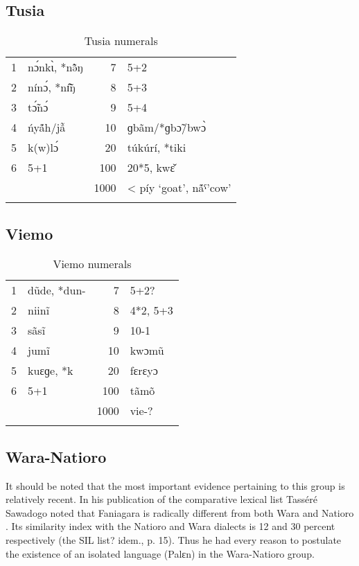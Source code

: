 \subsection{Tusia}%
\begin{table}
\caption{\label{tab:3:185}Tusia numerals}


\begin{tabularx}{\textwidth}{lQrQ}
\lsptoprule

1 & n{\'{ɔ}}nk{\`{ɩ}}, *n{\~{\^ə}}ŋ & 7 & 5+2\\
2 & nín{\'{ɔ}}, *n{\~{\^ɪ}}ŋ & 8 & 5+3\\
3 & t{\'{\~ɔ}}n{\'{ɔ}} & 9 & 5+4\\
4 & {\'{n}}y{\'{\~a}}h/j{\~{\^a}} & 10 & ɡb{\~{a}}m/*ɡb{\~{ɔ}}/bw{\`{ɔ}}\\
5 & k(w)l{\'{ɔ}} & 20 & t{\'{u}}k{\'{u}}rí, *tiki\\
6 & 5+1 & 100 & 20*5, kw{\v{ɛ}}\\
&  & 1000 & < píy `goat’, n{\'{\~a}}ˤ'cow'\\
\lspbottomrule
\end{tabularx}
\end{table}

 
\subsection{Viemo}%
\begin{table}
\caption{\label{tab:3:186}Viemo numerals}


\begin{tabularx}{\textwidth}{lQrQ}
\lsptoprule

1 & d{\~{u}}de, *dun- & 7 & 5+2?\\
2 & niin{\~{i}} & 8 & 4*2, 5+3\\
3 & s{\~{a}}s{\~{i}} & 9 & 10-1\\
4 & jum{\~{i}} & 10 & kwɔm{\~{u}}\\
5 & kuɛɡe, *k{} & 20 & fɛrɛyɔ\\
6 & 5+1 & 100 & t{\~{a}}m{\~{o}}\\
&  & 1000 & vie-?\\
\lspbottomrule
\end{tabularx}
\end{table}
 
\subsection{Wara-Natioro}%
It should be noted that the most important evidence pertaining to this group is relatively recent. In his publication of the comparative lexical list Tasséré Sawadogo noted that Faniagara is radically different from both Wara and Natioro \citep{Sawadogo2002}. Its similarity index with the Natioro and Wara dialects is 12 and 30 percent respectively (the SIL list? idem., p. 15). Thus he had every reason to postulate the existence of an isolated language (Palɛn) in the Wara-Natioro group. 

